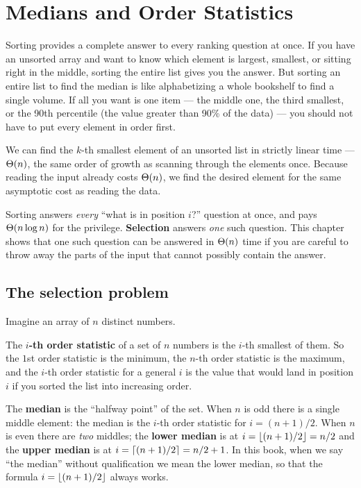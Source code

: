 \chapter{Medians and Order Statistics}

Sorting provides a complete answer to every ranking question at once. If you have an unsorted array and want to
know which element is largest, smallest, or sitting right in the middle, sorting
the entire list gives you the answer. But sorting an entire list to find the
median is like alphabetizing a whole bookshelf to find a single volume. If all you
want is one item --- the middle one, the third smallest, or the 90th percentile (the value greater than 90\% of the data) ---
you should not have to put every element in order first.

We can find the $k$-th smallest element of an unsorted list in strictly linear time --- $\Theta(n)$, the same
order of growth as scanning through the elements once. Because reading the
input already costs $\Theta(n)$, we find the desired element for the same asymptotic
cost as reading the data.

\begin{intuitionbox}
Sorting answers \emph{every} ``what is in position $i$?'' question at once, and
pays $\Theta(n\log n)$ for the privilege. \textbf{Selection} answers \emph{one}
such question. This chapter shows that one such question can be answered in $\Theta(n)$
time if you are careful to throw away the parts of the input that cannot
possibly contain the answer.
\end{intuitionbox}

\section{The selection problem}

Imagine an array of $n$ distinct numbers.

\begin{definition}\label{ch09:def-order-statistic}
The \textbf{$i$-th order statistic} of a set of $n$ numbers is the $i$-th smallest
of them. So the $1$st order statistic is the minimum, the $n$-th order statistic
is the maximum, and the $i$-th order statistic for a general $i$ is the value that
would land in position $i$ if you sorted the list into increasing order.
\end{definition}

\begin{definition}[Median]\label{ch09:def-median}
The \textbf{median} is the ``halfway point'' of the set. When $n$ is odd there is a
single middle element: the median is the $i$-th order statistic for
$i = (n+1)/2$. When $n$ is even there are \emph{two} middles; the
\textbf{lower median} is at $i = \lfloor(n+1)/2\rfloor = n/2$ and the \textbf{upper
median} is at $i = \lceil(n+1)/2\rceil = n/2 + 1$. In this book, when we say ``the
median'' without qualification we mean the lower median, so that the formula
$i = \lfloor(n+1)/2\rfloor$ always works.
\end{definition}

